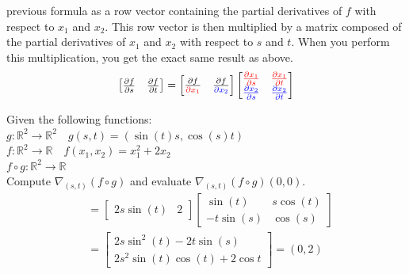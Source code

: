 \documentclass{article}
\begin{document}
previous formula as a row vector containing the partial derivatives of $f$
with respect to $x_1$ and $x_2$. This row vector is then multiplied by a
matrix composed of the partial derivatives of $x_1$ and $x_2$ with respect to
$s$ and $t$. When you perform this multiplication, you get the exact same
result as above.
$$
\begin{bmatrix}
    \frac{\partial{f}}{\partial{s}} & \frac{\partial{f}}{\partial{t}}
\end{bmatrix}=\begin{bmatrix}
    \frac{\partial{f}}{\color{red}\partial{x_1}} &
    \frac{\partial{f}}{\color{blue}\partial{x_2}}
\end{bmatrix}\begin{bmatrix}
    {\color{red}\frac{\partial{x_1}}{\partial{s}}} &
    {\color{red}\frac{\partial{x_1}}{\partial{t}}} \\ 
    {\color{blue}\frac{\partial{x_2}}{\partial{s}}} &
    {\color{blue}\frac{\partial{x_2}}{\partial{t}}}
\end{bmatrix}$$
\newpage
\begin{example}
    Given the following functions:\\
    $g:\mathbb{R}^2\to \mathbb{R}^2\quad g(s,t)=(\sin(t)s, \cos(s)t)$\\ 
    $f:\mathbb{R}^2\to \mathbb{R}\quad f(x_1,x_2)=x_1^2+2x_2$\\ 
    $f\circ g: \mathbb{R}^2\to \mathbb{R}$\\
    Compute $\nabla_{(s,t)}(f\circ g)$ and evaluate $\nabla_{(s,t)}(f\circ g)(0,0)$.
    $$
    \begin{aligned}
        &=\begin{bmatrix}
            2s\sin(t) & 2
        \end{bmatrix}
        \begin{bmatrix}
            \sin(t) & s\cos(t)\\ 
            -t\sin(s) & \cos(s)
        \end{bmatrix} \\ 
        &=\begin{bmatrix}
            2s\sin^2(t)-2t\sin(s) \\ 
            2s^2\sin(t)\cos(t)+2\cos{t}
        \end{bmatrix}=(0,2)
    \end{aligned}
    $$
\end{example}
\end{document}
